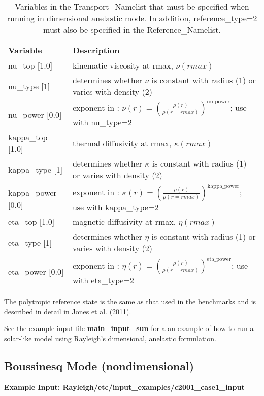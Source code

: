 \begin{table}
\centering
\begin{tabular}{| l | l |}
\hline
Variable & Description \\
\hline
nu\_top [1.0]   & kinematic viscosity at rmax, $\nu(rmax)$ \\
nu\_type [1]    & determines whether $\nu$ is constant with radius (1) or varies with density (2) \\
nu\_power [0.0] & exponent in : $\nu(r) = \left( \frac{\rho(r)}{\rho(r=rmax)} \right)^{\mathrm{nu\_power}}$; use with nu\_type=2 \\
\hline
kappa\_top [1.0]   & thermal diffusivity at rmax, $\kappa(rmax)$ \\
kappa\_type [1]    & determines whether $\kappa$ is constant with radius (1) or varies with density (2) \\
kappa\_power [0.0] & exponent in : $\kappa(r) = \left( \frac{\rho(r)}{\rho(r=rmax)} \right)^{\mathrm{kappa\_power}}$; use with kappa\_type=2 \\
\hline
eta\_top [1.0]   & magnetic diffusivity at rmax, $\eta(rmax)$ \\
eta\_type [1]    & determines whether $\eta$ is constant with radius (1) or varies with density (2) \\
eta\_power [0.0] & exponent in : $\eta(r) = \left( \frac{\rho(r)}{\rho(r=rmax)} \right)^{\mathrm{eta\_power}}$; use with eta\_type=2 \\
\hline
\end{tabular}
\caption{\label{table:anelastic_trans} Variables in the Transport\_Namelist that must be specified when running in dimensional anelastic mode. In addition, reference\_type=2 must also be specified in the Reference\_Namelist.}
\end{table}

The polytropic reference state is the same as that used in the benchmarks and is described in detail in Jones et al. (2011).

See the example input file \textbf{main\_input\_sun} for a an example of how to run a solar-like model using Rayleigh's dimensional, anelastic formulation.

\clearpage
\subsection{Boussinesq Mode (nondimensional)}\label{sec:physics_boussinesq_nondimensional}

\textbf{Example Input:  Rayleigh/etc/input\_examples/c2001\_case1\_input}

